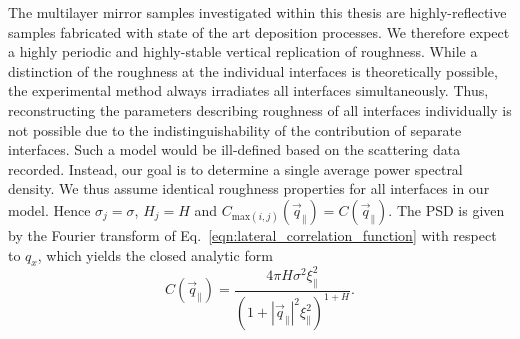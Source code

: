The multilayer mirror samples investigated within this thesis are highly-reflective samples fabricated with state of the art deposition processes. We therefore expect a highly periodic and highly-stable vertical replication of roughness. While a distinction of the roughness at the individual interfaces is theoretically possible, the experimental method always irradiates all interfaces simultaneously. Thus, reconstructing the parameters describing roughness of all interfaces individually is not possible due to the indistinguishability of the contribution of separate interfaces. Such a model would be ill-defined based on the scattering data recorded. Instead, our goal is to determine a single average power spectral density. We thus assume identical roughness properties for all interfaces in our model. Hence $\sigma_j = \sigma$, $H_j = H$ and $C_{\text{max}(i,j)}(\vec{q}_\parallel) = C(\vec{q}_\parallel)$. The PSD is given by the Fourier transform of Eq.~\eqref{eqn:lateral_correlation_function} with respect to $q_x$, which yields the closed analytic form
\begin{equation}
        C(\vec{q}_\parallel) = \frac{4 \pi H \sigma^2 \xi_\parallel^2}{(1+|\vec{q}_\parallel|^2\xi_\parallel^2)^{1+H}} \text{.} \label{ch_theo:eqn_psd} 
\end{equation}

